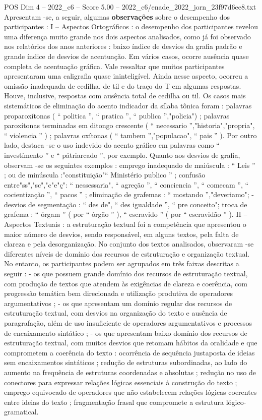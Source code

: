 \begin{textsample}{POS Dim 4 – 2022\_c6 – Score 5.00 – 2022\_c6/enade\_2022\_jorn\_23f97d6ee8.txt}
Apresentam -se, a seguir, algumas \textbf{observações} sobre o desempenho dos participantes : I – Aspectos Ortográficos : o desempenho dos participantes revelou uma diferença muito grande nos dois aspectos analisados, como já foi observado nos relatórios dos anos anteriores : baixo índice de desvios da grafia padrão e grande índice de desvios de acentuação.
Em vários casos, ocorre ausência quase completa de acentuação gráfica.
Vale ressaltar que muitos participantes apresentaram uma caligrafia quase ininteligível.
Ainda nesse aspecto, ocorreu a omissão inadequada de cedilha, de til e do traço do T em algumas respostas.
Houve, inclusive, respostas com ausência total de cedilha ou til.
Os casos mais sistemáticos de eliminação do acento indicador da sílaba tônica foram : palavras proparoxítonas ( “ politica ”, “ pratica ”, “ publica ”,"policia") ; palavras paroxítonas terminadas em ditongo crescente ( “ necessario ”,"historia","propria", “ violencia ” ) ; palavras oxítonas ( “ tambem ”,"populacao", “ pais ” ).
Por outro lado, destaca -se o uso indevido do acento gráfico em palavras como “ investímento ” e “ pátriarcado ”, por exemplo.
Quanto aos desvios de grafia, observam -se os seguintes exemplos : emprego inadequado de maiúscula : “ Leis ” ; ou de minúscula :"constituição"“ Ministério publico ” ; confusão entre"ss","sc","c"e"ç": “ nessessaria", “ agreção ”, “ conciencia ”, “ comecam ”, “ cocientização ”, “ pacos ” ; eliminação de grafemas : “ mostando ”,"deveriamo"; - desvios de segmentação : “ des de", “ des igualdade ”, “ pre conceito"; troca de grafema : “ órgam ” ( por “ órgão ” ), “ escravido ” ( por “ escravidão ” ).
II – Aspectos Textuais : a estruturação textual foi a competência que apresentou o maior número de desvios, sendo responsável, em alguns textos, pela falta de clareza e pela desorganização.
No conjunto dos textos analisados, observaram -se diferentes níveis de domínio dos recursos de estruturação e organização textual.
No entanto, os participantes podem ser agrupados em três faixas descritas a seguir : - os que possuem grande domínio dos recursos de estruturação textual, com produção de textos que atendem às exigências de clareza e coerência, com progressão temática bem direcionada e utilização produtiva de operadores argumentativos ; - os que apresentam um domínio regular dos recursos de estruturação textual, com desvios na organização do texto e ausência de paragrafação, além de uso insuficiente de operadores argumentativos e processos de encaixamento sintático ; - os que apresentam baixo domínio dos recursos de estruturação textual, com muitos desvios que retomam hábitos da oralidade e que comprometem a coerência do texto : ocorrência de sequência justaposta de ideias sem encaixamentos sintáticos ; redução de estruturas subordinadas, ao lado do aumento na frequência de estruturas coordenadas e absolutas ; redução no uso de conectores para expressar relações lógicas essenciais à construção do texto ; emprego equivocado de operadores que não estabelecem relações lógicas coerentes entre ideias do texto ; fragmentação frasal que compromete a estrutura lógico-gramatical.

\end{textsample}
